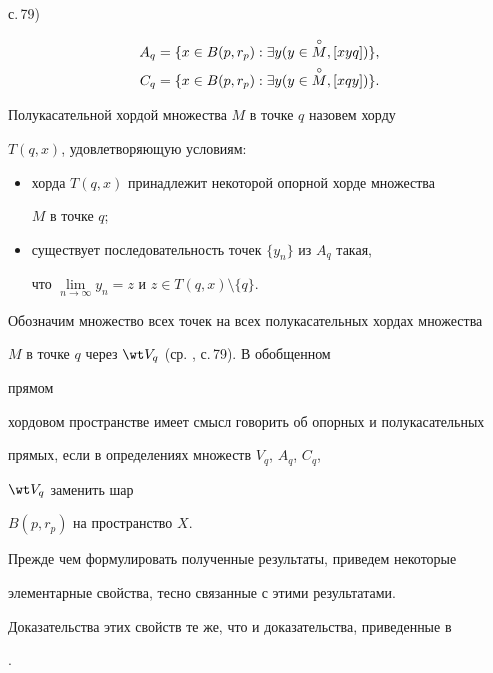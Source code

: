 с.\,79) 


\begin{align*} 


A_q&=\{x\in B(p,r_p):\exists y(y\in\cM,[xyq])\}, \\ 


C_q&=\{x\in B(p,r_p):\exists y(y\in\cM,[xqy])\}. 


\end{align*} 


Полукасательной хордой множества $M$ в точке $q$ назовем хорду 


$T(q,x)$, удовлетворяющую условиям: 


\begin{itemize} 


\item[a)] хорда $T(q,x)$ принадлежит некоторой опорной хорде множества 


$M$ в точке $q$; 


\item[б)] существует последовательность точек $\{y_n\}$ из $A_q$ такая, 


что $\lim\limits_{n\to\infty}y_n=z$ и $z\in T(q,x)\setminus\{q\}$. 


\end{itemize} 


Обозначим множество всех точек на всех полукасательных хордах множества 


$M$ в точке $q$ через $\wt V_q$ (ср. \cite{1}, с.\,79). В обобщенном 


прямом 


хордовом пространстве имеет смысл говорить об опорных и полукасательных 


прямых, если в определениях множеств $V_q$, $A_q$, $C_q$, 


$\wt V_q$ заменить шар 


$B(p,r_p)$ на пространство $X$. 


 


Прежде чем формулировать полученные результаты, приведем некоторые 


элементарные свойства, тесно связанные с этими результатами. 


Доказательства этих свойств те же, что и доказательства, приведенные в 


\cite{1}. 



